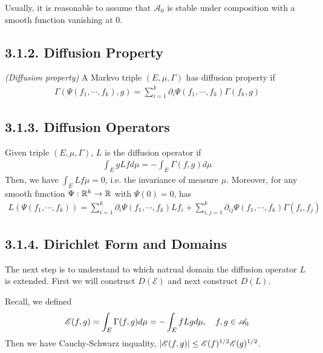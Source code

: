 \documentclass{article}
\begin{document}
Usually, it is reasonable to assume that $\mathscr{A}_0$ is stable under composition with a smooth function vanishing at 0.

\s

\subsection*{3.1.2. Diffusion Property}

 \emph{(Diffusion property)} A Markvo triple $(E, \mu, \Gamma)$ has diffusion property if
\begin{align*}
\Gamma(\Psi(f_1, \cdots, f_k),g) = \sum_{i=1}^k \partial_i \Psi(f_1, \cdots, f_k) \Gamma(f_k, g)
\end{align*}
\s

\subsection*{3.1.3. Diffusion Operators}

Given triple $(E, \mu, \Gamma)$, $L$ is the diffusion operator if
\begin{align*}
\int_E gLf d\mu = - \int_E \Gamma(f,g) d\mu
\end{align*}
Then, we have $\int_E Lf \mu =0$, i.e. the invariance of measure $\mu$. Moreover, for any smooth function $\Psi : \mathbb{R}^k \rightarrow \mathbb{R}$ with $\Psi(0)=0$, has
\begin{align*}
L(\Psi (f_1, \cdots, f_k))= \sum_{i=1}^k \partial_i \Psi(f_1, \cdots, f_k)Lf_i + \sum_{i,j=1}^k \partial_{ij}\Psi(f_1, \cdots, f_k) \Gamma(f_i, f_j)
\end{align*}
\s

\subsection*{3.1.4. Dirichlet Form and Domains}

The next step is to understand to which natrual domain the diffusion operator $L$ is extended. First we will construct $D(\mathscr{E})$ and next construct $D(L)$.

Recall, we defined
\begin{align*}
\mathscr{E}(f,g) = \int_E \Gamma(f,g)d\mu = - \int_E fLg d\mu, \quad f,g \in \mathscr{A}_0
\end{align*}
Then we have Cauchy-Schwarz inquality, $|\mathscr{E}(f,g)|\leq \mathscr{E}(f)^{1/2}\mathscr{E}(g)^{1/2}$.
\end{document}
